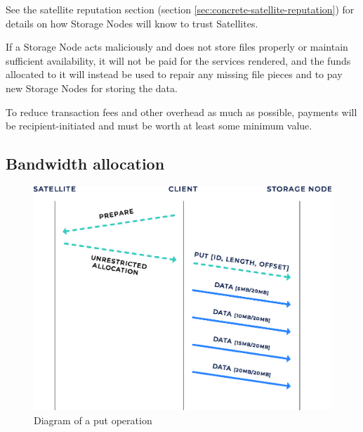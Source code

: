 \documentclass[8pt,fleqn,openany]{book}
\begin{document}
See the satellite reputation section
(section \ref{sec:concrete-satellite-reputation}) for details on
how Storage Nodes will know to trust Satellites.

If a Storage Node acts
maliciously and does not store files properly or maintain sufficient
availability, it will not be paid for the services rendered, and the funds
allocated to it will instead be used to repair any missing
file pieces and to pay new Storage Nodes for storing the data.

To reduce transaction fees and other overhead as much as possible, payments
will be recipient-initiated and must be worth at least some minimum value.

\subsection{Bandwidth allocation}\label{baer}

\begin{figure}[!htbp]
\centering
\includegraphics[height=.4\textheight]{images/put.eps}
\caption{Diagram of a put operation}
\label{fig:bap-put}
\end{figure}
\end{document}
